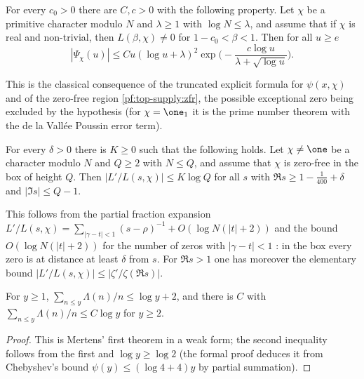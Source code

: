 \begin{littheorem}\label{pf:top-supply:psithin}
For every $c_0>0$ there are $C,c>0$ with the following property. Let $\chi$ be a primitive character modulo $N$
and $\lambda\ge1$ with $\log N\le\lambda$, and assume that if $\chi$ is real and non-trivial, then $L(\beta,\chi)\ne0$
for $1-c_0<\beta<1$. Then for all $u\ge e$
\[
|\Psi_\chi(u)|\le Cu(\log u+\lambda)^2\exp\Big(-\frac{c\log u}{\lambda+\sqrt{\log u}}\Big).
\]
 
\end{littheorem}

This is the classical consequence of the truncated explicit formula for $\psi(x,\chi)$ and of the zero-free region
\cref{pf:top-supply:zfr}, the possible exceptional zero being excluded by the hypothesis (for $\chi=\one_1$ it is the
prime number theorem with the de la Vall\'ee Poussin error term).

\begin{littheorem}\label{pf:top-supply:negLD}
For every $\delta>0$ there is $K\ge0$ such that the following holds. Let $\chi\ne\one$ be a character modulo $N$ and
$Q\ge2$ with $N\le Q$, and assume that $\chi$ is zero-free in the box of height $Q$. Then
$|L'/L(s,\chi)|\le K\log Q$ for all $s$ with $\Re s\ge1-\frac1{400}+\delta$ and $|\Im s|\le Q-1$.
\end{littheorem}

This follows from the partial fraction expansion $L'/L(s,\chi)=\sum_{|\gamma-t|<1}(s-\rho)^{-1}+O(\log N(|t|+2))$
and the bound $O(\log N(|t|+2))$ for the number of zeros with $|\gamma-t|<1$ \cite[Ch.~16]{Davenport2000}: in the box
every zero is at distance at least $\delta$ from $s$. For $\Re s>1$ one has moreover the elementary bound
$|L'/L(s,\chi)|\le|\zeta'/\zeta(\Re s)|$.

\begin{lemma}\label{pf:top-supply:mertens}
For $y\ge1$, $\sum_{n\le y}\Lambda(n)/n\le\log y+2$, and there is $C$ with $\sum_{n\le y}\Lambda(n)/n\le C\log y$
for $y\ge2$.  
\end{lemma}

\begin{proof}
This is Mertens' first theorem \cite{Mertens1874} in a weak form; the second inequality follows from the first and
$\log y\ge\log2$ (the formal proof deduces it from Chebyshev's bound $\psi(y)\le(\log4+4)y$ by partial summation).
\end{proof}

